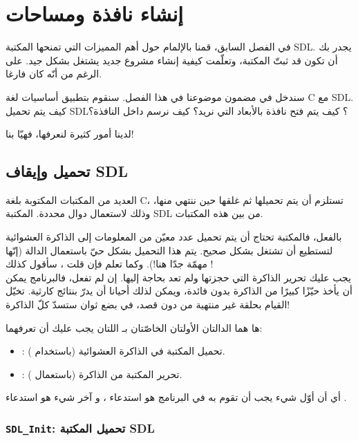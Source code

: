 \chapter{إنشاء نافذة ومساحات}

في الفصل السابق، قمنا بالإلمام حول أهم المميزات التي تمنحها المكتبة
\textenglish{SDL}.
يجدر بك أن تكون قد ثبتّ المكتبة، وتعلّمت كيفية إنشاء مشروع جديد يشتغل بشكل جيد.  على الرغم من أنّه كان فارغا.

سندخل في مضمون موضوعنا في هذا الفصل. سنقوم بتطبيق أساسيات لغة \textenglish{C}
مع
\textenglish{SDL}.
كيف يتم تحميل \textenglish{SDL}؟
كيف يتم فتح نافذة بالأبعاد التي نريد؟ كيف نرسم داخل النافذة؟

لدينا أمور كثيرة لنعرفها، فهيّا بنا!

\section{تحميل وإيقاف \textenglish{SDL}}

العديد من المكتبات المكتوبة بلغة \textenglish{C}،
تستلزم أن يتم تحميلها ثم غلقها حين ننتهي منها، وذلك لاستعمال دوال محددة. المكتبة
\textenglish{SDL}
من بين هذه المكتبات. 

بالفعل، فالمكتبة تحتاج أن يتم تحميل عدد معيّن من المعلومات إلى الذاكرة العشوائية لتستطيع أن تشتغل بشكل صحيح. يتم هذا التحميل بشكل حيّ باستعمال الدالة 
(إنّها مهمّة جدّا هنا!). وكما تعلم فإن قلت
،
سأقول كذلك
!\\
يجب عليك تحرير الذاكرة التي حجزتها ولم تعد بحاجة إليها. إن لم تفعل، فالبرنامج يمكن أن يأخذ حيّزًا كبيرًا من الذاكرة بدون فائدة، ويمكن لذلك أحيانا أن يدرّ بنتائج كارثية. تخيّل القيام بحلقة غير منتهية من
دون قصد، في بضع ثوان ستسدّ كلّ الذاكرة!

ها هما الدالتان الأولتان الخاصّتان بـ
اللتان يجب عليك أن تعرفهما:
\begin{itemize}
	\item {}:
	تحميل المكتبة في الذاكرة العشوائية (باستخدام ).
	\item {}:
	تحرير المكتبة من الذاكرة (باستعمال ).
\end{itemize}

أي أن أوّل شيء يجب أن تقوم به في البرنامج هو استدعاء
،
و آخر شيء هو استدعاء
.

\subsection{\texttt{SDL\_Init}: تحميل المكتبة \textenglish{SDL}}

